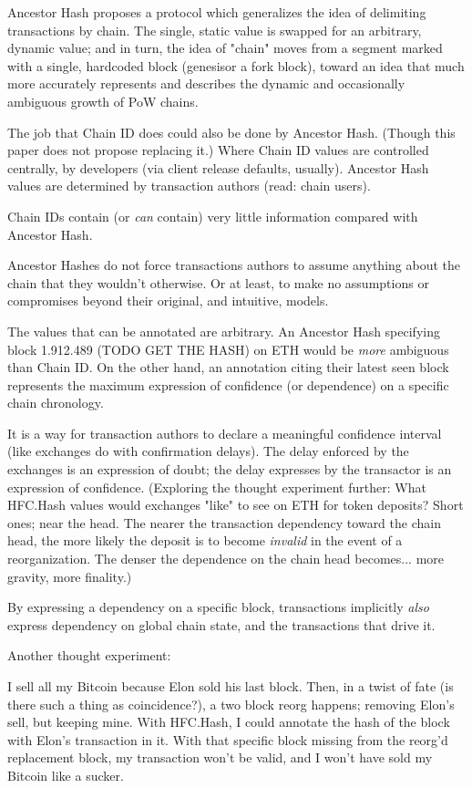 \documentclass[11pt]{article}
\theoremstyle{plain}
\begin{document}
Ancestor Hash proposes a protocol which generalizes the idea of delimiting
transactions by chain. The single, static value is swapped for an arbitrary,
dynamic value; and in turn, the idea of "chain" moves from a segment marked
with a single, hardcoded block (genesisor a fork block), toward an idea that
much more accurately represents and describes the dynamic and occasionally
ambiguous growth of PoW chains.

The job that Chain ID does could also be done by Ancestor Hash. (Though this
paper does not propose replacing it.)
Where Chain ID values are controlled centrally, by developers (via client
release defaults, usually). Ancestor Hash values are determined by transaction
authors (read: chain users).

Chain IDs contain (or \textit{can} contain) very little information compared
with Ancestor Hash.

Ancestor Hashes do not force transactions authors to assume anything about the
chain that they wouldn't otherwise. Or at least, to make no assumptions or
compromises beyond their original, and intuitive, models.

The values that can be annotated are arbitrary. An Ancestor Hash specifying
block 1.912.489 (TODO GET THE HASH) on ETH would be \textit{more} ambiguous
than Chain ID. On the other hand, an annotation citing their latest seen block
represents the maximum expression of confidence (or dependence) on a specific
chain chronology.

It is a way for transaction authors to declare a meaningful confidence interval
(like exchanges do with confirmation delays). The delay enforced by the
exchanges is an expression of doubt; the delay expresses by the transactor is
an expression of confidence. (Exploring the thought experiment further: What
HFC.Hash values would exchanges "like" to see on ETH for token deposits? Short
ones; near the head. The nearer the transaction dependency toward the chain
head, the more likely the deposit is to become \textit{invalid} in the event of
a reorganization. The denser the dependence on the chain head becomes... more
gravity, more finality.)

By expressing a dependency on a specific block, transactions implicitly
\textit{also} express dependency on global chain state, and the transactions
that drive it.

Another thought experiment:

I sell all my Bitcoin because Elon sold his last block. Then, in a twist of
fate (is there such a thing as coincidence?), a two block reorg happens;
removing Elon's sell, but keeping mine.
With HFC.Hash, I could annotate the hash of the block with Elon's transaction
in it. With that specific block missing from the reorg'd replacement block, my
transaction won't be valid, and I won't have sold my Bitcoin like a sucker.
\end{document}
